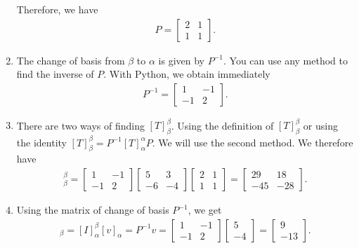 \documentclass[12pt]{article}
\begin{document}
\begin{enumerate}[label=\alph*)]
	Therefore, we have
		\begin{align*}
		P = \begin{bmatrix}
		2 & 1 \\ 1 & 1
		\end{bmatrix} .
		\end{align*}
	\item The change of basis from $\beta$ to $\alpha$ is given by $P^{-1}$. You can use any method to find the inverse of $P$. With Python, we obtain immediately
		\begin{align*}
		P^{-1} = \left[\begin{matrix}1 & -1\\-1 & 2\end{matrix}\right] .
		\end{align*}
	\item There are two ways of finding $[T]_{\beta}^\beta$. Using the definition of $[T]_{\beta}^\beta$ or using the identity $[T]_{\beta}^\beta = P^{-1} [T]_{\alpha}^\alpha P$. We will use the second method. We therefore have
		\begin{align*}
		[T]^\beta_\beta = \left[\begin{matrix}1 & -1\\-1 & 2\end{matrix}\right]
\left[\begin{matrix}5 & 3\\-6 & -4\end{matrix}\right]
\left[\begin{matrix}2 & 1\\1 & 1\end{matrix}\right] =
\left[\begin{matrix}29 & 18\\-45 & -28\end{matrix}\right] .
		\end{align*}
	\item Using the matrix of change of basis $P^{-1}$, we get
		\begin{align*}
		[v]_{\beta} = [I]_\alpha^\beta [v]_{\alpha} = P^{-1} v = \left[\begin{matrix}1 & -1\\-1 & 2\end{matrix}\right]
\left[\begin{matrix}5\\-4\end{matrix}\right] =
\left[\begin{matrix}9\\-13\end{matrix}\right] .

\end{align*}
\end{enumerate}
\end{document}
